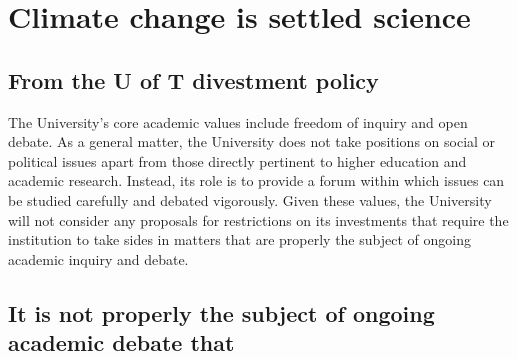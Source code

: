 


		\singlespacing
		\section{Climate change is settled science}
		\label{sec:SettledScience}
		\doublespacing





	
	\subsection{From the U of T divestment policy}



\begin{itquote}	
The University's core academic values include freedom of inquiry and open debate.
As a general matter, the University does not take positions on social or political issues apart from those directly pertinent to higher education and academic research. 
Instead, its role is to provide a forum within which issues can be studied carefully and debated vigorously. 
Given these values, the University will not consider any proposals for restrictions on its investments that require the institution to take sides in matters that are properly the subject of ongoing academic inquiry and debate.
\end{itquote}



	\subsection{It is not properly the subject of ongoing academic debate that}



